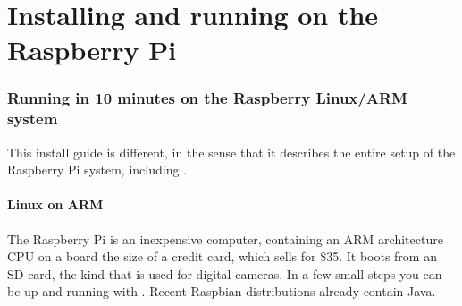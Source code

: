 \chapter{Installing and running on the Raspberry Pi}
\subsection{Running \nr{} in 10 minutes on the Raspberry Linux/ARM system}
This install guide is different, in the sense that it describes the entire setup of the Raspberry Pi system, including \nr{}.

\subsubsection{Linux on ARM}
The Raspberry Pi is an inexpensive computer, containing an ARM
architecture CPU on a board the size of a credit card, which sells for
\$35. It boots from an SD card, the kind that is used for digital cameras. In a few small steps you can be up and running with \nr{}. Recent Raspbian distributions already contain Java. 
